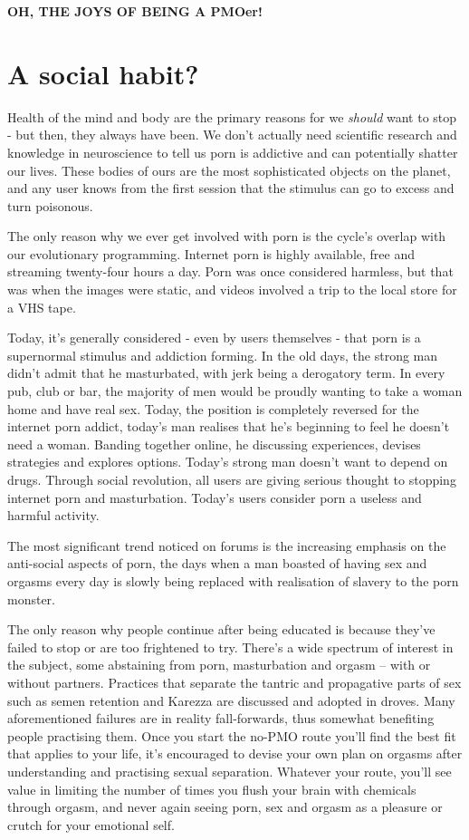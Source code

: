 \documentclass[
]{book}
\begin{document}
\textbf{OH, THE JOYS OF BEING A PMOer!}

\hypertarget{a-social-habit}{%
\chapter{A social habit?}\label{a-social-habit}}

Health of the mind and body are the primary reasons for we \emph{should} want to stop - but then, they always have been. We don't actually need scientific research and knowledge in neuroscience to tell us porn is addictive and can potentially shatter our lives. These bodies of ours are the most sophisticated objects on the planet, and any user knows from the first session that the stimulus can go to excess and turn poisonous.

The only reason why we ever get involved with porn is the cycle's overlap with our evolutionary programming. Internet porn is highly available, free and streaming twenty-four hours a day. Porn was once considered harmless, but that was when the images were static, and videos involved a trip to the local store for a VHS tape.

Today, it's generally considered - even by users themselves - that porn is a supernormal stimulus and addiction forming. In the old days, the strong man didn't admit that he masturbated, with jerk being a derogatory term. In every pub, club or bar, the majority of men would be proudly wanting to take a woman home and have real sex. Today, the position is completely reversed for the internet porn addict, today's man realises that he's beginning to feel he doesn't need a woman. Banding together online, he discussing experiences, devises strategies and explores options. Today's strong man doesn't want to depend on drugs. Through social revolution, all users are giving serious thought to stopping internet porn and masturbation. Today's users consider porn a useless and harmful activity.

The most significant trend noticed on forums is the increasing emphasis on the anti-social aspects of porn, the days when a man boasted of having sex and orgasms every day is slowly being replaced with realisation of slavery to the porn monster.

The only reason why people continue after being educated is because they've failed to stop or are too frightened to try. There's a wide spectrum of interest in the subject, some abstaining from porn, masturbation and orgasm -- with or without partners. Practices that separate the tantric and propagative parts of sex such as semen retention and Karezza are discussed and adopted in droves. Many aforementioned failures are in reality fall-forwards, thus somewhat benefiting people practising them. Once you start the no-PMO route you'll find the best fit that applies to your life, it's encouraged to devise your own plan on orgasms after understanding and practising sexual separation. Whatever your route, you'll see value in limiting the number of times you flush your brain with chemicals through orgasm, and never again seeing porn, sex and orgasm as a pleasure or crutch for your emotional self.
\end{document}
